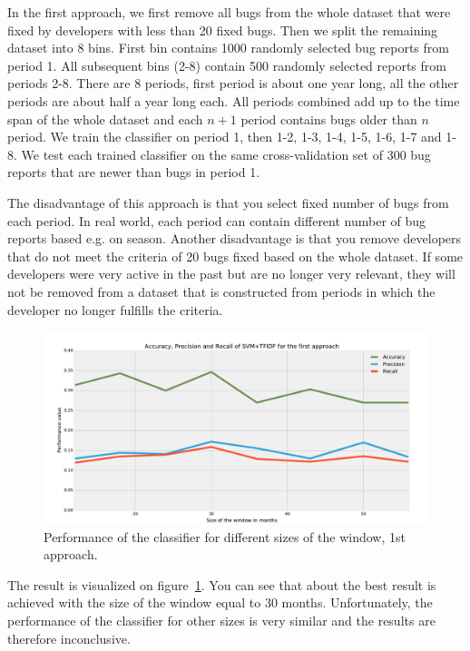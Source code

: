In the first approach, we first remove all bugs from the whole dataset that were fixed by developers with less than 20 fixed bugs. Then we split the remaining dataset into 8 bins. First bin contains 1000 randomly selected bug reports from period 1. All subsequent bins (2-8) contain 500 randomly selected reports from periods 2-8. There are 8 periods, first period is about one year long, all the other periods are about half a year long each. All periods combined add up to the time span of the whole dataset and each $n+1$ period contains bugs older than $n$ period. We train the classifier on period 1, then 1-2, 1-3, 1-4, 1-5, 1-6, 1-7 and 1-8. We test each trained classifier on the same cross-validation set of 300 bug reports that are newer than bugs in period 1.

The disadvantage of this approach is that you select fixed number of bugs from each period. In real world, each period can contain different number of bug reports based e.g. on season. Another disadvantage is that you remove developers that do not meet the criteria of 20 bugs fixed based on the whole dataset. If some developers were very active in the past but are no longer very relevant, they will not be removed from a dataset that is constructed from periods in which the developer no longer fulfills the criteria.

\begin{figure}[htbp]
    \centering
        \includegraphics[width=\textwidth]{./images/window_size/firefox_1a.pdf}
    \caption{Performance of the classifier for different sizes of the window, 1st approach.}
    \label{fig:window.firefox.1a}
\end{figure}

The result is visualized on figure~\ref{fig:window.firefox.1a}. You can see that about the best result is achieved with the size of the window equal to 30 months. Unfortunately, the performance of the classifier for other sizes is very similar and the results are therefore inconclusive.

